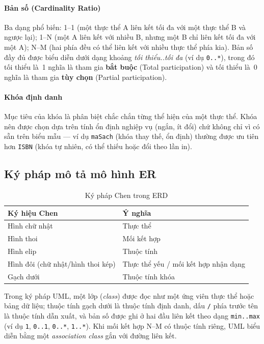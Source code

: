 \paragraph{Bản số (Cardinality Ratio)}
Ba dạng phổ biến: 1--1 (một thực thể A liên kết tối đa với một thực thể B và ngược lại); 1--N (một A liên kết với nhiều B, nhưng một B chỉ liên kết tối đa với một A); N--M (hai phía đều có thể liên kết với nhiều thực thể phía kia). Bản số đầy đủ được biểu diễn dưới dạng khoảng \emph{tối thiểu..tối đa} (ví dụ \texttt{0..*}), trong đó tối thiểu là~1 nghĩa là tham gia \textbf{bắt buộc} (Total participation) và tối thiểu là~0 nghĩa là tham gia \textbf{tùy chọn} (Partial participation).

\paragraph{Khóa định danh}
Mục tiêu của khóa là phân biệt chắc chắn từng thể hiện của một thực thể. Khóa nên được chọn dựa trên tính ổn định nghiệp vụ (ngắn, ít đổi) chứ không chỉ vì có sẵn trên biểu mẫu --- ví dụ \texttt{maSach} (khóa thay thế, ổn định) thường được ưu tiên hơn \texttt{ISBN} (khóa tự nhiên, có thể thiếu hoặc đổi theo lần in).

\subsection{Ký pháp mô tả mô hình ER}
\label{sec:kyphap_er}

\begin{table}[H]
\centering
\begin{tabular}{|l|l|}
\hline
\textbf{Ký hiệu Chen} & \textbf{Ý nghĩa} \\
\hline
Hình chữ nhật & Thực thể \\
Hình thoi & Mối kết hợp \\
Hình elip & Thuộc tính \\
Hình đôi (chữ nhật/hình thoi kép) & Thực thể yếu / mối kết hợp nhận dạng \\
Gạch dưới & Thuộc tính khóa \\
\hline
\end{tabular}
\caption{Ký pháp Chen trong ERD}
\label{tab:kyphap_chen}
\end{table}

Trong ký pháp UML, một lớp (\emph{class}) được đọc như một ứng viên thực thể hoặc bảng dữ liệu; thuộc tính gạch dưới là thuộc tính định danh, dấu \texttt{/} phía trước tên là thuộc tính dẫn xuất, và bản số được ghi ở hai đầu liên kết theo dạng \texttt{min..max} (ví dụ \texttt{1}, \texttt{0..1}, \texttt{0..*}, \texttt{1..*}). Khi mối kết hợp N--M có thuộc tính riêng, UML biểu diễn bằng một \emph{association class} gắn với đường liên kết.

